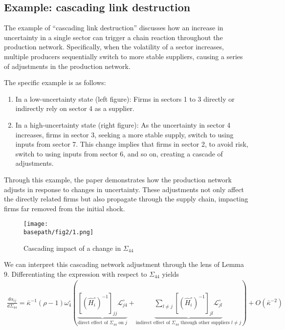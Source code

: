 \documentclass[11pt]{article}
\theoremstyle{definition}
\newcommand{\basepath}{F:/12004835/replication_package_final/replication_package_final/output_figures}
\begin{document}
	\subsection*{Example: cascading link destruction}
	The example of ``cascading link destruction'' discusses how an increase in uncertainty in a single sector can trigger a chain reaction throughout the production network. Specifically, when the volatility of a sector increases, multiple producers sequentially switch to more stable suppliers, causing a series of adjustments in the production network.
	
	The specific example is as follows:
	\begin{enumerate}[leftmargin=1cm, label=\arabic*.]
		\item In a low-uncertainty state (left figure): Firms in sectors 1 to 3 directly or indirectly rely on sector 4 as a supplier.
		\item In a high-uncertainty state (right figure): As the uncertainty in sector 4 increases, firms in sector 3, seeking a more stable supply, switch to using inputs from sector 7. This change implies that firms in sector 2, to avoid risk, switch to using inputs from sector 6, and so on, creating a cascade of adjustments.
	\end{enumerate}

	Through this example, the paper demonstrates how the production network adjusts in response to changes in uncertainty. These adjustments not only affect the directly related firms but also propagate through the supply chain, impacting firms far removed from the initial shock.
	
	\begin{figure}[ht]
		\caption{Cascading impact of a change in $\Sigma_{44}$}
		\texttt{[image: \\basepath/fig2/1.png]}
		\label{fig:2}
	\end{figure}
	
	We can interpret this cascading network adjustment through the lens of Lemma 9. Differentiating the expression with respect to $\Sigma_{44}$ yields
	\begin{align}
		\frac{d\alpha_{ij}}{d\Sigma_{44}} = \bar{\kappa}^{-1} (\rho - 1) \omega_4^{\circ} \left( \underbrace{\left[ \left(\hat{H}_i^{\circ}\right)^{-1} \right]_{jj} \mathcal{L}^{\circ}_{j4}}\limits_{\text{direct effect of }\Sigma_{44}\text{ on }j} + \underbrace{\sum\limits_{l\neq j} \left[\left(\hat{H}_i^{\circ}\right)^{-1}\right]_{jl}\mathcal{L}^{\circ}_{jl}}_{\text{indirect effect of }\Sigma_{44}\text{ through other suppliers }l\neq j}
		 \right) + O(\bar{\kappa}^{-2}) \label{eq-37}
	\end{align}
	
\end{document}
